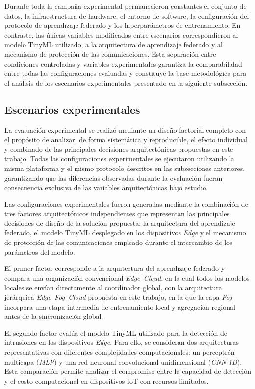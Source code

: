 \documentclass[journal,article,submit,moreauthors]{Definitions/mdpi}
\begin{document}
Durante toda la campaña experimental permanecieron constantes el conjunto de datos, la infraestructura de hardware, el entorno de software, la configuración del protocolo de aprendizaje federado y los hiperparámetros de entrenamiento. En contraste, las únicas variables modificadas entre escenarios correspondieron al modelo TinyML utilizado, a la arquitectura de aprendizaje federado y al mecanismo de protección de las comunicaciones. Esta separación entre condiciones controladas y variables experimentales garantiza la comparabilidad entre todas las configuraciones evaluadas y constituye la base metodológica para el análisis de los escenarios experimentales presentado en la siguiente subsección.

\subsection{Escenarios experimentales}
\label{sec:experimental_scenarios}
La evaluación experimental se realizó mediante un diseño factorial completo con el propósito de analizar, de forma sistemática y reproducible, el efecto individual y combinado de las principales decisiones arquitectónicas propuestas en este trabajo. Todas las configuraciones experimentales se ejecutaron utilizando la misma plataforma y el mismo protocolo descritos en las subsecciones anteriores, garantizando que las diferencias observadas durante la evaluación fueran consecuencia exclusiva de las variables arquitectónicas bajo estudio.

Las configuraciones experimentales fueron generadas mediante la combinación de tres factores arquitectónicos independientes que representan las principales decisiones de diseño de la solución propuesta: la arquitectura del aprendizaje federado, el modelo TinyML desplegado en los dispositivos \textit{Edge} y el mecanismo de protección de las comunicaciones empleado durante el intercambio de los parámetros del modelo.

El primer factor corresponde a la arquitectura del aprendizaje federado y compara una organización convencional \textit{Edge--Cloud}, en la cual todos los modelos locales se envían directamente al coordinador global, con la arquitectura jerárquica \textit{Edge--Fog--Cloud} propuesta en este trabajo, en la que la capa \textit{Fog} incorpora una etapa intermedia de entrenamiento local y agregación regional antes de la sincronización global.

El segundo factor evalúa el modelo TinyML utilizado para la detección de intrusiones en los dispositivos \textit{Edge}. Para ello, se consideran dos arquitecturas representativas con diferentes complejidades computacionales: un perceptrón multicapa (\textit{MLP}) y una red neuronal convolucional unidimensional (\textit{CNN-1D}). Esta comparación permite analizar el compromiso entre la capacidad de detección y el costo computacional en dispositivos IoT con recursos limitados.
\end{document}
